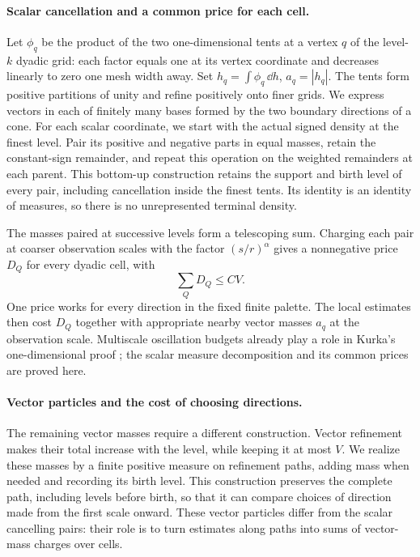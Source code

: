 \paragraph{Scalar cancellation and a common price for each cell.}
Let $\phi_q$ be the product of the two one-dimensional tents at a
vertex $q$ of the level-$k$ dyadic grid: each factor equals one at its
vertex coordinate and decreases linearly to zero one mesh width away. Set $h_q=\int\phi_q\,\dd h$, $a_q=|h_q|$.
The tents form positive partitions of unity and refine positively
onto finer grids. We express vectors in each of finitely many bases formed by the two
boundary directions of a cone. For each scalar coordinate, we start
with the actual signed density at the finest level.
Pair its positive and negative parts in equal masses, retain the
constant-sign remainder, and repeat this operation on the weighted
remainders at each parent. This bottom-up construction retains
the support and birth level of every pair, including cancellation
inside the finest tents. Its identity is an identity of measures,
so there is no unrepresented terminal density.

The masses paired at successive levels form a telescoping sum.
Charging each pair at coarser
observation scales with the factor $(s/r)^\alpha$ gives a
nonnegative price $D_Q$ for every dyadic cell, with
\begin{equation}\label{eq:overview-price-budget}
 \sum_Q D_Q\le CV.
\end{equation}
One price works for every direction in the fixed finite palette.
The local estimates then cost $D_Q$ together with appropriate
nearby vector masses $a_q$ at the observation scale. Multiscale oscillation budgets already
play a role in Kurka's one-dimensional proof
\cite[Lemma~1.5]{Kurka2015}; the scalar measure decomposition and
its common prices are proved here.

\paragraph{Vector particles and the cost of choosing directions.}
The remaining vector masses require a different construction.
Vector refinement makes their total increase with the level,
while keeping it at most $V$. We realize these masses by a finite
positive measure on refinement paths, adding mass when needed
and recording its birth level. This construction preserves the
complete path, including levels before birth, so that it can
compare choices of direction made from the first scale onward.
These vector particles differ from the scalar cancelling pairs:
their role is to turn estimates along paths into sums of vector-mass
charges over cells.

